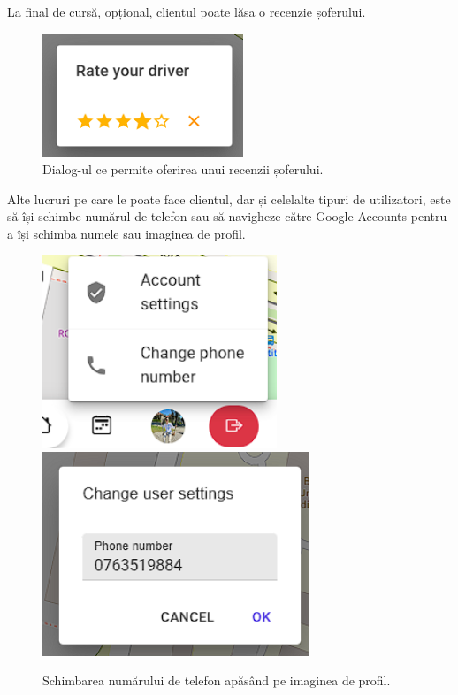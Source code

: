 La final de cursă, opțional, clientul poate lăsa o recenzie șoferului.

\begin{figure}[H]
    \centering
    \includegraphics[width=6cm]{Assets/rateDriver.png}
    \caption{Dialog-ul ce permite oferirea unui recenzii șoferului.}
    \label{fig:rateDriver}
\end{figure}

Alte lucruri pe care le poate face clientul, dar și celelalte tipuri de utilizatori,
este să își schimbe numărul de telefon sau să navigheze către Google Accounts pentru a își schimba numele sau imaginea de profil.

\begin{figure}[H]
    \centering
    \includegraphics[width=7cm]{Assets/popoverUser.png}
    \includegraphics[width=8cm]{Assets/changePhoneNumber.png}
    \caption{Schimbarea numărului de telefon apăsând pe imaginea de profil.}
    \label{fig:phoneNumberChange}
\end{figure}

